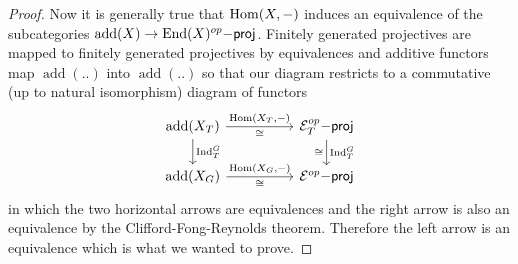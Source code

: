 \begin{proof}
\medbreak
Now it is generally true that $\operatorname{Hom}(X,-)$ induces an equivalence of the subcategories $\operatorname{add}(X) \to \operatorname{End}(X)^{op}\mathsf{-proj}$. Finitely generated projectives are mapped to finitely generated projectives by equivalences and additive functors map $\operatorname{add}(..)$ into $\operatorname{add}(..)$ so that our diagram restricts to a commutative (up to natural isomorphism) diagram of functors
\[\begin{tikzcd}
\operatorname{add}(X_T) \arrow[rr,"{\Hom(X_T,-)}","\isomorphic"'] \arrow[d,"\Ind_T^G"] && \mathcal{E}_T^{op}\mathsf{-proj} \arrow[d,"\Ind_T^G","\isomorphic"'] \\
\operatorname{add}(X_G) \arrow[rr,"{\Hom(X_G,-)}","\isomorphic"'] && \mathcal{E}^{op}\mathsf{-proj}
\end{tikzcd}\]
in which the two horizontal arrows are equivalences and the right arrow is also an equivalence by the Clifford-Fong-Reynolds theorem. Therefore the left arrow is an equivalence which is what we wanted to prove.
\end{proof}
